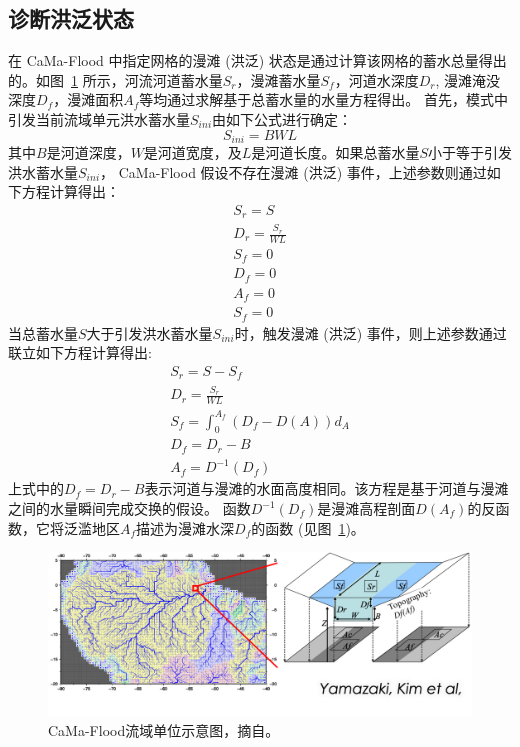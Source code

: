 \subsection{诊断洪泛状态}\label{诊断洪泛状态}
在 CaMa-Flood 中指定网格的漫滩 (洪泛) 状态是通过计算该网格的蓄水总量得出的。如图~\ref{fig:CaMa-Flood流域单位示意图}
所示，河流河道蓄水量$S_r$，漫滩蓄水量$S_f$，河道水深度$D_r$, 漫滩淹没深度$D_f$，漫滩面积$A_f$等均通过求解基于总蓄水量的水量方程得出。
首先，模式中引发当前流域单元洪水蓄水量$S_{ini}$由如下公式进行确定：
\begin{equation}
S_{ ini }=B WL
\end{equation}
其中$B$是河道深度，$W$是河道宽度，及$L$是河道长度。如果总蓄水量$S$小于等于引发洪水蓄水量$S_{ini}$，
CaMa-Flood 假设不存在漫滩 (洪泛) 事件，上述参数则通过如下方程计算得出：
\begin{equation}
    \begin{array}{l}S_r=S \\ D_r=\frac{S_r}{WL} \\ S_f=0 \\ D_f=0 \\ A_f=0 \\ S_f=0\end{array}
\end{equation}
当总蓄水量$S$大于引发洪水蓄水量$S_{ini}$时，触发漫滩 (洪泛) 事件，则上述参数通过联立如下方程计算得出:
\begin{equation}
\begin{array}{l}S_r=S-S_f \\ D_r=\frac{S_r}{W L} \\ S_f=\int_{0}^{A_f}(D_f-D(A)) d_A \\ D_f=D_r-B \\ A_f=D^{-1}(D_f)\end{array}
\end{equation}
上式中的$D_f = D_r - B$表示河道与漫滩的水面高度相同。该方程是基于河道与漫滩之间的水量瞬间完成交换的假设。
函数$D^{-1}(D_f)$是漫滩高程剖面$D(A_f)$的反函数，它将泛滥地区$A_f$描述为漫滩水深$D_f$的函数 (见图~\ref{fig:CaMa-Flood流域单位示意图})。


{
\begin{figure}[]
\centering
\includegraphics{Figures/陆地表面的水分循环/CaMa-Flood流域单位示意图.png}
\caption{CaMa-Flood流域单位示意图，摘自\citet{yamazaki2011physically}。 }
\label{fig:CaMa-Flood流域单位示意图}
\end{figure}
}

